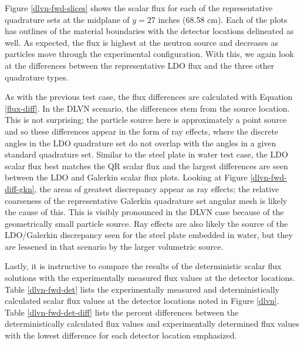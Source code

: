 \documentclass{article} %
\begin{document}
Figure \ref{dlvn-fwd-slices} shows the scalar flux for each of the
representative quadrature sets at the midplane of $y = 27$ inches (68.58 cm).
Each of the plots has outlines of the material boundaries with the detector
locations delineated as well. As expected, the flux is highest at the neutron
source and decreases as particles move through the experimental configuration.
With this, we again look at the differences between the representative LDO flux
and the three other quadrature types. 

As with the previous test case, the flux differences 
are calculated with Equation \ref{flux-diff}. In the DLVN scenario, the 
differences stem from the source location. This is not surprising; the particle
source here is approximately a point source and so these differences appear in
the form of ray effects, where the discrete angles in the LDO quadrature set do
not overlap with the angles in a given standard quadrature set. Similar to the
steel plate in water test case, the LDO scalar flux best matches the QR scalar
flux and the largest differences are seen between the LDO and Galerkin scalar
flux plots. Looking at Figure \ref{dlvn-fwd-diff-gkn}, the areas of greatest
discrepancy appear as ray effects; the relative coarseness of the
representative Galerkin quadrature set angular mesh is likely the cause of
this. This is visibly pronounced in the DLVN case because of the geometrically
small particle source. Ray effects are also likely the source of the 
LDO/Galerkin discrepancy seen for the steel plate embedded in water, but
they are lessened in that scenario by the larger volumetric source.

Lastly, it is instructive to compare the results of the deterministic
scalar flux solutions with the experimentally measured flux values at the
detector locations. Table \ref{dlvn-fwd-det} lists the experimentally measured
\cite{dlvn1991} and deterministically calculated scalar flux values at the
detector locations noted in Figure \ref{dlvn}. Table \ref{dlvn-fwd-det-diff}
lists the percent differences between the deterministically calculated flux
values and experimentally determined flux values with the lowest difference
for each detector location emphasized.
\end{document}
